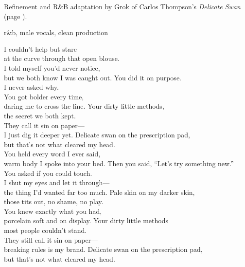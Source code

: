 
\begin{notes}
Refinement and R\&B adaptation by Grok of Carlos Thompson's \emph{Delicate Swan} (page \pageref{sec:delicate-swan}).
\end{notes}
\begin{style}
r\&b, male vocals, clean production
\end{style}
\begin{lyrics}
I couldn’t help but stare\\
at the curve through that open blouse.\\
I told myself you’d never notice,\\
but we both know I was caught out.
You did it on purpose.\\
I never asked why.\\
You got bolder every time,\\
daring me to cross the line.
Your dirty little methods,\\
the secret we both kept.\\
They call it sin on paper—\\
I just dig it deeper yet.
Delicate swan on the prescription pad,\\
but that’s not what cleared my head.\\
You held every word I ever said,\\
warm body I spoke into your bed.
Then you said, “Let’s try something new.”\\
You asked if you could touch.\\
I shut my eyes and let it through—\\
the thing I’d wanted far too much.
Pale skin on my darker skin,\\
those tits out, no shame, no play.\\
You knew exactly what you had,\\
porcelain soft and on display.
Your dirty little methods\\
most people couldn’t stand.\\
They still call it sin on paper—\\
breaking rules is my brand.
Delicate swan on the prescription pad,\\
but that’s not what cleared my head.\\

\end{lyrics}
